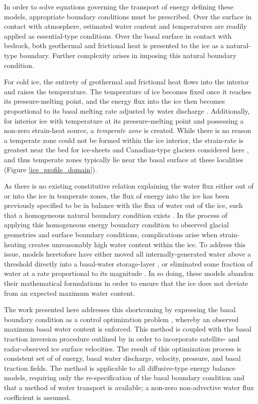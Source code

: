 In order to solve equations governing the transport of energy defining these models, appropriate boundary conditions must be prescribed.  Over the surface in contact with atmosphere, estimated water content and temperatures are readily applied as essential-type conditions.  Over the basal surface in contact with bedrock, both geothermal and frictional heat is presented to the ice as a natural-type boundary.  Further complexity arises in imposing this natural boundary condition.

For cold ice, the entirety of geothermal and frictional heat flows into the interior and raises the temperature.  The temperature of ice becomes fixed once it reaches its pressure-melting point, and the energy flux into the ice then becomes proportional to its basal melting rate adjusted by water discharge \citep{greve_1997}.  Additionally, for interior ice with temperature at its pressure-melting point and possessing a non-zero strain-heat source, a  \emph{temperate zone} is created.  While there is no reason a temperate zone could not be formed within the ice interior, the strain-rate is greatest near the bed for ice-sheets and Canadian-type glaciers considered here \citep{aschwanden_2012}, and thus temperate zones typically lie near the basal surface at these localities (Figure \ref{ice_profile_domain}).

As there is no existing constitutive relation explaining the water flux either out of or into the ice in temperate zones, the flux of energy into the ice has been previously specified to be in balance with the flux of water out of the ice, such that a homogeneous natural boundary condition exists \citep{greve_1997, greve_2009, aschwanden_2009, aschwanden_2012, kleiner_2015, blatter_2015}.  In the process of applying this homogeneous energy boundary condition to observed glacial geometries and surface boundary conditions, complications arise when strain-heating creates unreasonably high water content within the ice.  To address this issue, models heretofore have either moved all internally-generated water above a threshold directly into a basal-water storage-layer \citep{greve_1997}, or eliminated some fraction of water at a rate proportional to its magnitude \citep[][section 4.6]{aschwanden_2012}.  In so doing, these models abandon their mathematical formulations in order to ensure that the ice does not deviate from an expected maximum water content. 

The work presented here addresses this shortcoming by expressing the basal boundary condition as a control optimization problem \citep{bryson_1975, nocedal_2000}, whereby an observed maximum basal water content is enforced.  This method is coupled with the basal traction inversion procedure outlined by \citet{macayeal_1993} in order to incorporate satellite- and radar-observed ice surface velocities.  The result of this optimization process is consistent set of of energy, basal water discharge, velocity, pressure, and basal traction fields.  The method is applicable to all diffusive-type energy balance models, requiring only the re-specification of the basal boundary condition and that a method of water transport is available; \ie a non-zero non-advective water flux coefficient is assumed.

